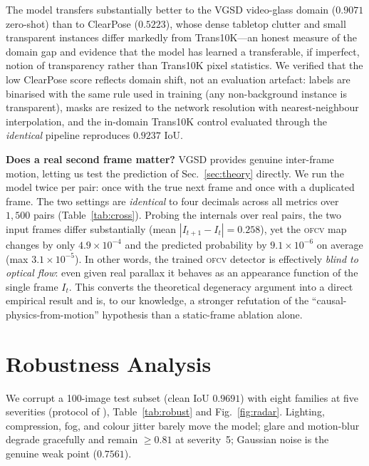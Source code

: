\documentclass[conference]{IEEEtran}
\newcommand{\ofcv}{\textsc{ofcv}}
\newcommand{\iou}{IoU}
\begin{document}
The model transfers substantially better to the VGSD video-glass domain
($0.9071$ zero-shot) than to ClearPose ($0.5223$), whose dense tabletop clutter
and small transparent instances differ markedly from Trans10K---an honest
measure of the domain gap and evidence that the model has learned a
transferable, if imperfect, notion of transparency rather than Trans10K pixel
statistics. We verified that the low ClearPose score reflects domain shift, not
an evaluation artefact: labels are binarised with the same rule used in training
(any non-background instance is transparent), masks are resized to the network
resolution with nearest-neighbour interpolation, and the in-domain Trans10K
control evaluated through the \emph{identical} pipeline reproduces $0.9237$
\iou{}.

\textbf{Does a real second frame matter?} VGSD provides genuine inter-frame
motion, letting us test the prediction of Sec.~\ref{sec:theory} directly. We run
the model twice per pair: once with the true next frame and once with a
duplicated frame. The two settings are \emph{identical} to four decimals across
all metrics over $1{,}500$ pairs (Table~\ref{tab:cross}). Probing the internals over real pairs, the
two input frames differ substantially (mean $|I_{t+1}-I_t|=0.258$), yet the
\ofcv{} map changes by only $4.9\times10^{-4}$ and the predicted probability by
$9.1\times10^{-6}$ on average (max $3.1\times10^{-5}$). In other words, the
trained \ofcv{} detector is effectively \emph{blind to optical flow}: even given
real parallax it behaves as an appearance function of the single frame
$I_t$. This converts the theoretical degeneracy argument into a direct empirical
result and is, to our knowledge, a stronger refutation of the
``causal-physics-from-motion'' hypothesis than a static-frame ablation alone.

\section{Robustness Analysis}
\label{sec:robust}
We corrupt a 100-image test subset (clean \iou{} $0.9691$) with eight families
at five severities (protocol of \cite{hendrycks2019robustness}),
Table~\ref{tab:robust} and Fig.~\ref{fig:radar}. Lighting, compression, fog, and
colour jitter barely move the model; glare and motion-blur degrade gracefully
and remain $\ge 0.81$ at severity~5; Gaussian noise is the genuine weak point
($0.7561$).
\end{document}
